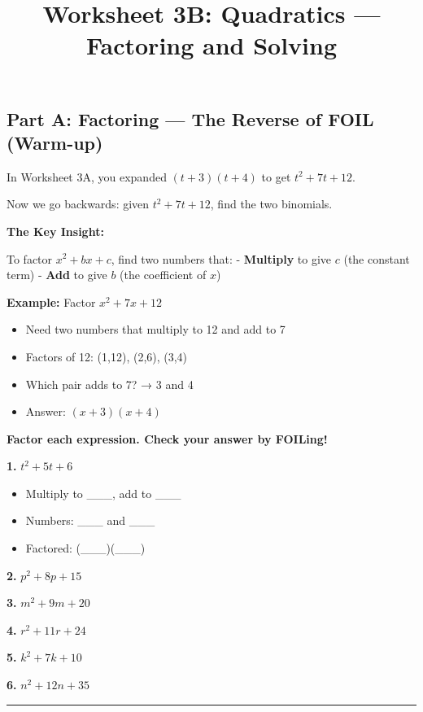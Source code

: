 \documentclass[
  11pt,
]{article}
\title{Worksheet 3B: Quadratics --- Factoring and Solving}
\author{}
\date{}
\providecommand{\tightlist}{%
  \setlength{\itemsep}{0pt}\setlength{\parskip}{0pt}}
\begin{document}
\maketitle

\hypertarget{part-a-factoring-the-reverse-of-foil-warm-up}{%
\subsection{Part A: Factoring --- The Reverse of FOIL
(Warm-up)}\label{part-a-factoring-the-reverse-of-foil-warm-up}}

In Worksheet 3A, you expanded \((t + 3)(t + 4)\) to get
\(t^2 + 7t + 12\).

Now we go backwards: given \(t^2 + 7t + 12\), find the two binomials.

\textbf{The Key Insight:}

To factor \(x^2 + bx + c\), find two numbers that: - \textbf{Multiply}
to give \(c\) (the constant term) - \textbf{Add} to give \(b\) (the
coefficient of \(x\))

\textbf{Example:} Factor \(x^2 + 7x + 12\)

\begin{itemize}
\tightlist
\item
  Need two numbers that multiply to 12 and add to 7
\item
  Factors of 12: (1,12), (2,6), (3,4)
\item
  Which pair adds to 7? → 3 and 4
\item
  Answer: \((x + 3)(x + 4)\)
\end{itemize}

\textbf{Factor each expression. Check your answer by FOILing!}

\textbf{1.} \(t^2 + 5t + 6\)

\begin{itemize}
\tightlist
\item
  Multiply to \_\_\_, add to \_\_\_
\item
  Numbers: \_\_\_ and \_\_\_
\item
  Factored: (\_\_\_)(\_\_\_)
\end{itemize}

\textbf{2.} \(p^2 + 8p + 15\)

\textbf{3.} \(m^2 + 9m + 20\)

\textbf{4.} \(r^2 + 11r + 24\)

\textbf{5.} \(k^2 + 7k + 10\)

\textbf{6.} \(n^2 + 12n + 35\)

\begin{center}\rule{0.5\linewidth}{0.5pt}\end{center}
\end{document}

